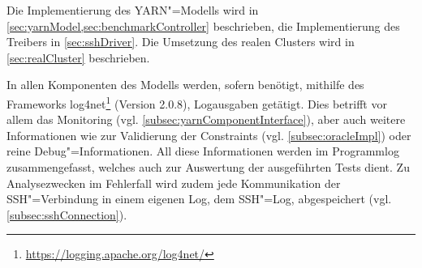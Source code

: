 Die Implementierung des \ac{YARN}"=Modells wird in \cref{sec:yarnModel,sec:benchmarkController} beschrieben, die Implementierung des Treibers in \cref{sec:sshDriver}.
Die Umsetzung des realen Clusters wird in \cref{sec:realCluster} beschrieben.

In allen Komponenten des Modells werden, sofern benötigt, mithilfe des Frameworks log4net\footnote{\url{https://logging.apache.org/log4net/}} (Version 2.0.8), Logausgaben getätigt.
Dies betrifft vor allem das Monitoring (vgl. \cref{subsec:yarnComponentInterface}), aber auch weitere Informationen wie zur Validierung der Constraints (vgl. \cref{subsec:oracleImpl}) oder reine Debug"=Informationen.
All diese Informationen werden im Programmlog zusammengefasst, welches auch zur Auswertung der ausgeführten Tests dient.
Zu Analysezwecken im Fehlerfall wird zudem jede Kommunikation der SSH"=Verbindung in einem eigenen Log, dem SSH"=Log, abgespeichert (vgl. \cref{subsec:sshConnection}).
